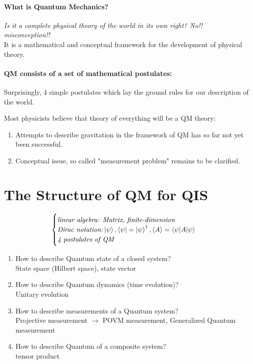 \documentclass[]{book}
\theoremstyle{nonumberplain}
\begin{document}
\paragraph{What is Quantum Mechanics?}
    \textit{Is it a complete physical theory of the world in its own right? No!! misconception!!} \\
	It is a mathematical and conceptual  framework for the development of physical theory.
\paragraph{QM consists of a set of mathematical postulates:}
\label{par:qm_consists_of_a_set_of_mathematical_postulates_}
\begin{center}
Surprisingly, 4 simple postulates which lay the ground rules for our description of the world.\\
\end{center}
Most physicists believe that theory of everything will be a QM theory:
\begin{enumerate}
	\item Attempts to describe gravitation in the framework of QM has so far not yet been successful.
	\item Conceptual issue, so called "measurement problem" remains to be clarified.
\end{enumerate}
\section{The Structure of QM for QIS}
\label{sec:the_structure_of_qm_for_qis}
\begin{equation*}
\begin{cases}
	\textit{linear algebra: Matrix, finite-dimension}\\
	\textit{Dirac notation:} \ket{\psi}, \bra{\psi}=\ket{\psi}^{\dagger}, \langle A \rangle = \braket{\psi|A|\psi}\\
	\textit{4 postulates of QM}
\end{cases}
\end{equation*}
\begin{enumerate}
	\item How to describe Quantum state of a closed system? \\
		State space (Hilbert space), state vector
	\item How to describe Quantum dynamics (time evolution)? \\
		Unitary evolution
	\item How to describe measurements of a Quantum system? \\
		Projective measurement $\rightarrow$ POVM measurement, Generalized Quantum measurement
	\item How to describe Quantum of a composite system? \\
		tensor product
\end{enumerate}
\end{document}
